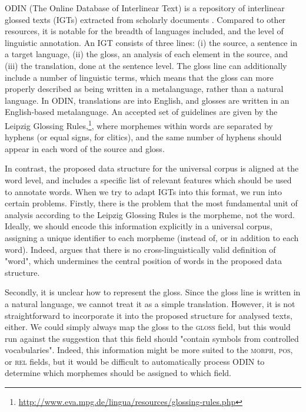 ODIN (The Online Database of Interlinear Text) is a repository of interlinear glossed texts (IGTs) extracted from scholarly documents \cite{lewis2006odin,lewis2010odin}.  Compared to other resources, it is notable for the breadth of languages included, and the level of linguistic annotation.  An IGT consists of three lines: (i) the source, a sentence in a target language, (ii) the gloss, an analysis of each element in the source, and (iii) the translation, done at the sentence level. The gloss line can additionally include a number of linguistic terms, which means that the gloss can more properly described as being written in a metalanguage, rather than a natural language.  In ODIN, translations are into English, and glosses are written in an English-based metalanguage.  An accepted set of guidelines are given by the Leipzig Glossing Rules,\footnote{\url{http://www.eva.mpg.de/lingua/resources/glossing-rules.php}}, where morphemes within words are separated by hyphens (or equal signs, for clitics), and the same number of hyphens should appear in each word of the source and gloss.

In contrast, the proposed data structure for the universal corpus is aligned at the word level, and includes a specific list of relevant features which should be used to annotate words. When we try to adapt IGTs into this format, we run into certain problems.  Firstly, there is the problem that the most fundamental unit of analysis according to the Leipzig Glossing Rules is the morpheme, not the word.  Ideally, we should encode this information explicitly in a universal corpus, assigning a unique identifier to each morpheme (instead of, or in addition to each word). Indeed,  argues that there is no cross-linguistically valid definition of "word", which undermines the central position of words in the proposed data structure.

Secondly, it is unclear how to represent the gloss.  Since the gloss line is written in a natural language, we cannot treat it as a simple translation.  However, it is not straightforward to incorporate it into the proposed structure for analysed texts, either.  We could simply always map the gloss to the \textsc{gloss} field, but this would run against the suggestion that this field should "contain symbols from controlled vocabularies".  Indeed, this information might be more suited to the \textsc{morph, pos,} or \textsc{rel} fields, but it would be difficult to automatically process ODIN to determine which morphemes should be assigned to which field.

